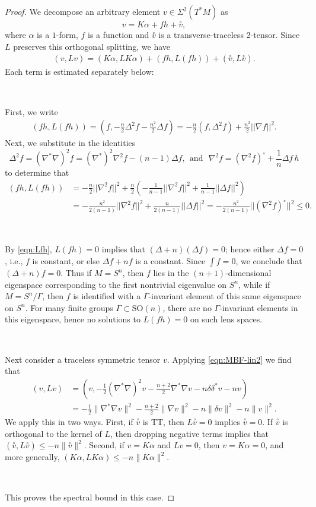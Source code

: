\documentclass[10pt,reqno]{amsart}
\newcommand{\ttv}{\stackrel{\circ}{v}}
\begin{document}
\begin{proof}
We decompose an arbitrary element  $ v \in \Sigma^2(T^*M) $ as 
\[ 
v = K \alpha + f h + \ttv, 
\]
where $\alpha$ is a $1$-form, $f$ is a function and $\ttv$ is a transverse-traceless 2-tensor. Since $L$ preserves this orthogonal splitting, we have 
\begin{align*}
(v, Lv) = (K\alpha, L K \alpha) + (f h, L( fh)) + ( \ttv, L\ttv).
\end{align*}
Each term is estimated separately below: 

\

First, we write 
\begin{align*} 
(fh,L (fh)) =  (f, -\frac{n}{2}\Delta^2 f - \frac{n^2}{2} \Delta f) = -\frac{n}{2}(f, \Delta^2 f) + \frac{n^2}{2} ||\nabla f||^2.
\end{align*}
Next, we substitute in the identities
\[
\Delta^2 f = (\nabla^*\nabla)^2 f = (\nabla^*)^2\nabla^2 f - (n-1)\Delta f, \ \ \mbox{and}\ \ \ \nabla^2 f = (\nabla^2 f)^\circ + \frac{1}{n} \Delta f\, h
\]
to determine that
\begin{align*}
(fh, L(fh)) & = -\frac{n}{2} ||\nabla^2 f||^2 + \frac{n}{2} \left( -\frac{1}{n-1} ||\nabla^2 f||^2 + \frac{1}{n-1}||\Delta f||^2\right) \nonumber \\
& = -\frac{n^2}{2(n-1)} ||\nabla^2 f||^2 + \frac{n}{2(n-1)} ||\Delta f||^2 = - \frac{n^2}{2(n-1)} ||(\nabla^2 f)^\circ||^2 \leq 0.
\end{align*}

\

By \eqref{eqn:Lfh}, $L(fh ) = 0$ implies that $(\Delta + n)(\Delta f) = 0$; hence either $\Delta f = 0$, i.e., $f$ is constant, 
or else $\Delta f + n f$ is a constant.  Since $\int f = 0$, we conclude that $(\Delta + n)f = 0$.  Thus if $M = S^n$, then
$f$ lies in the $(n+1)$-dimensional eigenspace corresponding to the first nontrivial eigenvalue on $S^n$, while 
if $M = S^n/\Gamma$, then $f$ is identified with a $\Gamma$-invariant element of this same eigenspace on $S^n$.
For many finite groups $\Gamma \subset \mathrm{SO}(n)$, there are no $\Gamma$-invariant elements in this 
eigenspace, hence no solutions to $L(fh) = 0$ on such lens spaces. 

\

Next consider a traceless symmetric tensor $v$.  Applying \eqref{eqn:MBF-lin2} we find that
\begin{eqnarray*}
(v, Lv) &= ( v, -\tfrac12 (\nabla^*\nabla)^2 v - \frac{n+2}{2}\nabla^*\nabla v - n \delta \delta^* v - nv) \nonumber \\
&= -\frac{1}{2} \| \nabla^*\nabla v \|^2 - \frac{n+2}{2} \| \nabla v \|^2 - n \| \delta v \|^2 - n \|v\|^2.
\end{eqnarray*}
We apply this in two ways. First, if $\ttv$ is TT, then $L\ttv = 0$ implies $\ttv = 0$.  If $\ttv$ is orthogonal to the kernel of $L$, then dropping negative terms implies that $(\ttv, L\ttv) \leq - n \| \ttv \|^2$.   Second, if $v = K\alpha$ and $L v = 0$, then 
$v = K \alpha = 0$, and more generally, $(K \alpha, L K \alpha) \leq - n \| K \alpha \|^2 $.

\

This proves the spectral bound in this case.
\end{proof}
 
\end{document}
